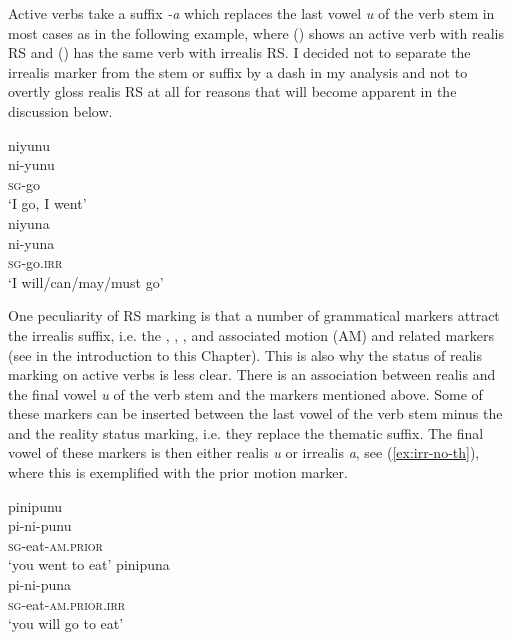 Active verbs take a suffix \textit{-a} which replaces the last vowel \textit{u} of the verb stem in most cases as in the following example, where () shows an active verb with realis RS and () has the same verb with irrealis RS. I decided not to separate the irrealis marker from the stem or suffix by a dash in my analysis and not to overtly gloss realis RS at all for reasons that will become apparent in the discussion below. 

\ea\label{ex:IRR-yunu}
  \ea\label{ex:IRR-yunu.1}
 \begingl 
\glpreamble niyunu\\
\gla ni-yunu\\ 
\textsc{sg}-go\\ 
\glft ‘I go, I went’\\ 
\endgl
  \ex\label{ex:IRR-yunu.2}
 \begingl
\glpreamble niyuna\\
\gla ni-yuna\\
\textsc{sg}-go.\textsc{irr}\\
\glft ‘I will/can/may/must go’
\endgl
\z
\xe

One peculiarity of RS marking is that a number of grammatical markers attract the irrealis suffix, i.e. the , , , and associated motion  (AM) and related markers (see  in the introduction to this Chapter). This is also why the status of realis marking on active verbs is less clear. There is an association between realis and the final vowel \textit{u} of the verb stem and the markers mentioned above. Some of these markers can be inserted between the last vowel of the verb stem minus the  and the reality status marking, i.e. they replace the thematic suffix. The final vowel of these markers is then either realis \textit{u} or irrealis \textit{a}, see (\ref{ex:irr-no-th}), where this is exemplified with the prior motion marker.

\ea\label{ex:irr-no-th}
  \ea
\begingl
\glpreamble pinipunu\\
\gla pi-ni-punu\\
\textsc{sg}-eat-\textsc{am.prior}\\
\glft ‘you went to eat’
\endgl
  \ex
\begingl
\glpreamble pinipuna\\
\gla pi-ni-puna\\
\textsc{sg}-eat-\textsc{am.prior.irr}\\
\glft ‘you will go to eat’
\endgl
\z
\xe

